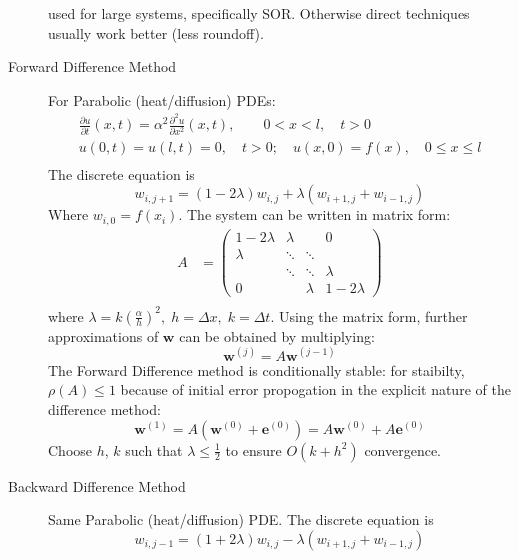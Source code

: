 \documentclass[8pt]{article}
\begin{document}
\begin{multicols}{2}
\begin{description}
    used for large systems, specifically SOR.
    Otherwise direct techniques usually work better (less roundoff).
    \pagebreak[4]
  \item[Forward Difference Method] For Parabolic (heat/diffusion) PDEs:
    \begin{equation*}
      \begin{aligned}
        &\frac{\partial u}{\partial t}(x,t) =
        \alpha^2\frac{\partial^2u}{\partial x^2}(x,t), \qquad
        0<x<l,\quad t>0& \\
        &u(0,t)=u(l,t)=0,\quad t>0; \quad u(x,0)=f(x),\quad 0\leq x\leq
        l& \\
      \end{aligned}
    \end{equation*}
    The discrete equation is
    $$w_{i,j+1}=(1-2\lambda)w_{i,j}+\lambda(w_{i+1,j}+w_{i-1,j})$$
    Where $w_{i,0}=f(x_i)$. The system can be written in
    matrix form:
    \begin{equation*}
      \begin{aligned}
        A&=
        \begin{pmatrix}
            1-2\lambda & \lambda & & 0\\
            \lambda& \ddots & \ddots & \\
            & \ddots & \ddots & \lambda\\
            0 & & \lambda & 1-2\lambda
          \end{pmatrix} \\
      \end{aligned}
    \end{equation*}
    where $\lambda = k\left(\frac{\alpha}{h}\right)^2,\;h=\Delta
    x,\;k=\Delta t$. Using the matrix form, further approximations of
    $\mathbf{w}$ can be obtained by multiplying:
    $$ \mathbf{w}^{(j)} = A\mathbf{w}^{(j-1)} $$
    The Forward Difference method is conditionally stable: for
    staibilty, $\rho(A)\leq1$ because of initial error propogation in
    the explicit nature of the difference method:
    $$\mathbf{w}^{(1)}=A(\mathbf{w}^{(0)}+\mathbf{e}^{(0)}) =
    A\mathbf{w}^{(0)} + A\mathbf{e}^{(0)}$$ 
    Choose $h$, $k$ such that $\lambda\leq\frac{1}{2}$ to ensure
    $O(k+h^2)$ convergence. 
  \item[Backward Difference Method] Same Parabolic (heat/diffusion)
    PDE. The discrete equation is
    $$w_{i,j-1}=(1+2\lambda)w_{i,j}-\lambda(w_{i+1,j}+w_{i-1,j})$$

\end{description}
\end{multicols}
\end{document}
